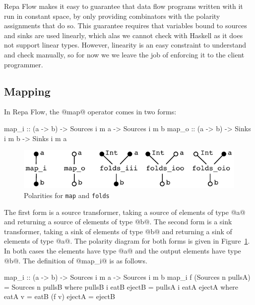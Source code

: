 Repa Flow makes it easy to guarantee that data flow programs written with it run in constant space, by only providing combinators with the polarity assignments that do so. This guarantee requires that variables bound to sources and sinks are used linearly, which alas we cannot check with Haskell as it does not support linear types. However, linearity is an easy constraint to understand and check manually, so for now we we leave the job of enforcing it to the client programmer.


\subsection{Mapping}
\label{s:Mapping}
In Repa Flow, the @map@ operator comes in two forms:
\begin{code}
map_i :: (a -> b) -> Sources i m a -> Sources i m b
map_o :: (a -> b) -> Sinks   i m b -> Sinks   i m a
\end{code}

\begin{figure}
\begin{center}
\includegraphics[scale=0.8]{figures/maps.pdf}
\end{center}
\vspace{-0.5em}
\caption{Polarities for \texttt{map} and \texttt{folds}}
\label{f:Map}
\end{figure}

The first form is a source transformer, taking a source of elements of type @a@ and returning a source of elements of type @b@. The second form is a sink transformer, taking a sink of elements of type @b@ and returning a sink of elements of type @a@. The polarity diagram for both forms is given in Figure~\ref{f:Map}. In both cases the elements have type @a@ and the output elements have type @b@. The definition of @map_i@ is as follows. 
\begin{code}
map_i :: (a -> b) -> Sources i m a -> Sources i m b
map_i f (Sources n pullsA)
 = Sources n pullsB
 where  pullsB i eatB ejectB
         = pullsA i eatA ejectA
         where  eatA v = eatB (f v)
                ejectA = ejectB
\end{code}

